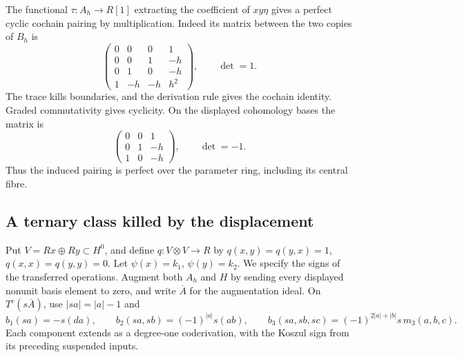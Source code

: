 The functional \(\tau:A_h\to R[1]\) extracting
the coefficient of \(xy\eta\) gives a perfect cyclic
cochain pairing by multiplication. Indeed its matrix
between the two copies of \(B_h\) is
\begin{equation}\label{cyidx:eq:trace-matrix}
 \begin{pmatrix}
 0&0&0&1\\0&0&1&-h\\0&1&0&-h\\1&-h&-h&h^2
 \end{pmatrix},\qquad \det=1.
\end{equation}
The trace kills boundaries, and the derivation rule
gives the cochain identity. Graded commutativity gives
cyclicity. On the displayed cohomology bases the matrix is
\begin{equation}\label{cyidx:eq:H-trace}
 \begin{pmatrix}0&0&1\\0&1&-h\\1&0&-h\end{pmatrix},
                    \qquad\det=-1.
\end{equation}
Thus the induced pairing is perfect over the parameter
ring, including its central fibre.

\subsection{A ternary class killed by the displacement}

Put \(V=Rx\oplus Ry\subset H^0\), and define
\(q:V\otimes V\to R\) by
\(q(x,y)=q(y,x)=1\), \(q(x,x)=q(y,y)=0\).
Let \(\psi(x)=k_1\), \(\psi(y)=k_2\).
We specify the signs of the transferred operations.
Augment both \(A_h\) and \(H\) by sending every
displayed nonunit basis element to zero, and write
\(\overline A\) for the augmentation ideal. On
\(T^c(s\overline A)\), use \(|sa|=|a|-1\) and
\[
 b_1(sa)=-s(da),\qquad
 b_2(sa,sb)=(-1)^{|a|}s(ab),\qquad
 b_3(sa,sb,sc)=(-1)^{2|a|+|b|}s\,m_3(a,b,c).
\]
Each component extends as a degree-one coderivation,
with the Koszul sign from its preceding suspended inputs.


